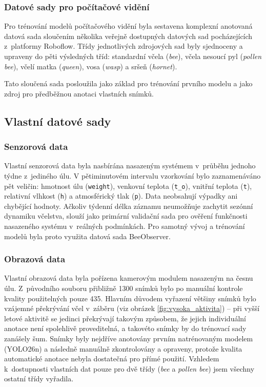 \subsubsection*{Datové sady pro počítačové vidění}
Pro trénování modelů počítačového vidění byla sestavena komplexní anotovaná datová sada sloučením několika veřejně dostupných datových sad pocházejících z~platformy Roboflow. Třídy jednotlivých zdrojových sad byly sjednoceny a upraveny do pěti výsledných tříd: standardní včela (\textit{bee}), včela nesoucí pyl (\textit{pollen bee}), včelí matka (\textit{queen}), vosa (\textit{wasp}) a sršeň (\textit{hornet}). 

Tato sloučená sada posloužila jako základ pro trénování prvního modelu a jako zdroj pro předběžnou anotaci vlastních snímků.

\subsection*{Vlastní datové sady}

\subsubsection*{Senzorová data}
Vlastní senzorová data byla nasbírána nasazeným systémem v~průběhu jednoho týdne z~jediného úlu. V pětiminutovém intervalu vzorkování bylo zaznamenáváno pět veličin: hmotnost úlu (\texttt{weight}), venkovní teplota (\texttt{t\_o}), vnitřní teplota (\texttt{t}), relativní vlhkost (\texttt{h}) a atmosférický tlak (\texttt{p}). Data neobsahují výpadky ani chybějící hodnoty. Ačkoliv týdenní délka záznamu neumožňuje zachytit sezónní dynamiku včelstva, slouží jako primární validační sada pro ověření funkčnosti nasazeného systému v~reálných podmínkách. Pro samotný vývoj a trénování modelů byla proto využita datová sada BeeObserver.

\subsubsection*{Obrazová data}
Vlastní obrazová data byla pořízena kamerovým modulem nasazeným na česnu úlu. Z~původního souboru přibližně 1300 snímků bylo po manuální kontrole kvality použitelných pouze 435. Hlavním důvodem vyřazení většiny snímků bylo vzájemné překrývání včel v~záběru (viz obrázek \ref{fig:vysoka_aktivita}) -- při vyšší letové aktivitě se jedinci překrývají takovým způsobem, že jejich individuální anotace není spolehlivě proveditelná, a takovéto snímky by do trénovací sady zanášely šum. Snímky byly nejdříve anotovány prvním natrénovaným modelem (YOLO26n) a následně manuálně zkontrolovány a opraveny, protože kvalita automatické anotace nebyla dostatečná pro přímé použití. Vzhledem k~dostupnosti vlastních dat pouze pro dvě třídy (\textit{bee} a \textit{pollen bee}) jsem všechny ostatní třídy vyřadila.

